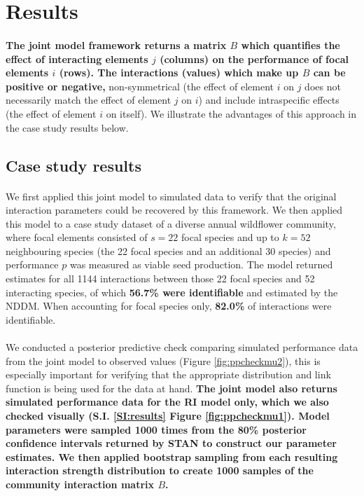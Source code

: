 \documentclass[a4,12pt]{article}
\begin{document}
\section{Results}
    
    \paragraph{}
    \textbf{The joint model framework returns a matrix $B$ which quantifies the effect of interacting elements $j$ (columns) on the performance of focal elements $i$ (rows). The interactions (values) which make up $B$ can be positive or negative,} non-symmetrical (the effect of element $i$ on $j$ does not necessarily match the effect of element $j$ on $i$) and include intraspecific effects (the effect of element $i$ on itself). We illustrate the advantages of this approach in the case study results below. 


    \subsection{Case study results}

    \paragraph{}
    We first applied this joint model to simulated data to verify that the original interaction parameters could be recovered by this framework. We then applied this model to a case study dataset of a diverse annual wildflower community, where focal elements consisted of \textbf{$s = 22$} focal species and up to \textbf{$k = 52$} neighbouring species (the 22 focal species and an additional 30 species) and performance $p$ was measured as viable seed production. The model returned estimates for all 1144 interactions between those 22 focal species and 52 interacting species, of which \textbf{56.7\% were identifiable} and estimated by the NDDM.  When accounting for focal species only, \textbf{82.0\%} of interactions were identifiable. 

    \paragraph{}
    We conducted a posterior predictive check comparing simulated performance data from the joint model to observed values (Figure \ref{fig:ppcheckmu2}), this is especially important for verifying that the appropriate distribution and link function is being used for the data at hand. \textbf{The joint model also returns simulated performance data for the RI model only, which we also checked visually (S.I. \ref{SI:results} Figure \ref{fig:ppcheckmu1}). Model parameters were sampled 1000 times from the 80\% posterior confidence intervals returned by STAN to construct our parameter estimates. We then applied bootstrap sampling from each resulting interaction strength distribution to create 1000 samples of the community interaction matrix $B$.}
\end{document}
